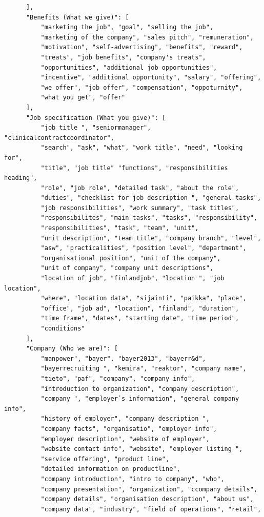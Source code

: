 \begin{verbatim}
      ],
      "Benefits (What we give)": [
          "marketing the job", "goal", "selling the job",
          "marketing of the company", "sales pitch", "remuneration",
          "motivation", "self-advertising", "benefits", "reward",
          "treats", "job benefits", "company's treats",
          "opportunities", "additional job opportunities",
          "incentive", "additional opportunity", "salary", "offering",
          "we offer", "job offer", "compensation", "oppoturnity",
          "what you get", "offer"
      ],
      "Job specification (What you give)": [
          "job title ", "seniormanager", "clinicalcontractcoordinator",
          "search", "ask", "what", "work title", "need", "looking for",
          "title", "job title" "functions", "responsibilities heading",
          "role", "job role", "detailed task", "about the role",
          "duties", "checklist for job description ", "general tasks",
          "job responsibilities", "work summary", "task titles",
          "responsibilites", "main tasks", "tasks", "responsibility",
          "responsibilities", "task", "team", "unit",
          "unit description", "team title", "company branch", "level",
          "asw", "practicalities", "position level", "department",
          "organisational position", "unit of the company",
          "unit of company", "company unit descriptions",
          "location of job", "finlandjob", "location ", "job location",
          "where", "location data", "sijainti", "paikka", "place",
          "office", "job ad", "location", "finland", "duration",
          "time frame", "dates", "starting date", "time period",
          "conditions"
      ],
      "Company (Who we are)": [
          "manpower", "bayer", "bayer2013", "bayerr&d",
          "bayerrecruiting ", "kemira", "reaktor", "company name",
          "tieto", "paf", "company", "company info",
          "introduction to organization", "company description",
          "company ", "employer`s information", "general company info",
          "history of employer", "company description ",
          "company facts", "organisatio", "employer info",
          "employer description", "website of employer",
          "website contact info", "website", "employer listing ",
          "service offering", "product line",
          "detailed information on productline",
          "company introduction", "intro to company", "who",
          "company presentation", "organization", "ccompany details",
          "company details", "organisation description", "about us",
          "company data", "industry", "field of operations", "retail",

\end{verbatim}
